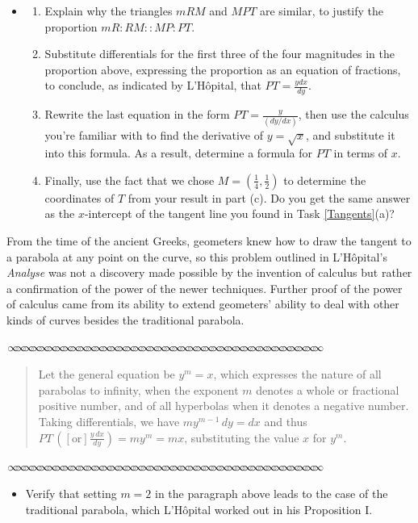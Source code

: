 \documentclass[11pt]{article}
\newcommand{\sep}{\vspace{-3pt}
\begin{center}
{\mathversion{normal}
$\infty \mspace{-5.5mu}\infty \mspace{-5.5mu}\infty \mspace{-5.5mu}\infty \mspace{-5.5mu}
\infty \mspace{-5.5mu}\infty \mspace{-5.5mu}\infty \mspace{-5.5mu}\infty \mspace{-5.5mu}
\infty \mspace{-5.5mu}\infty \mspace{-5.5mu}\infty \mspace{-5.5mu}\infty \mspace{-5.5mu}
\infty \mspace{-5.5mu}\infty \mspace{-5.5mu}\infty \mspace{-5.5mu}\infty \mspace{-5.5mu}
\infty \mspace{-5.5mu}\infty \mspace{-5.5mu}\infty \mspace{-5.5mu}\infty \mspace{-5.5mu}
\infty \mspace{-5.5mu}\infty \mspace{-5.5mu}\infty \mspace{-5.5mu}\infty \mspace{-5.5mu}
\infty \mspace{-5.5mu}\infty \mspace{-5.5mu}\infty \mspace{-5.5mu}\infty \mspace{-5.5mu}
\infty \mspace{-5.5mu}\infty \mspace{-5.5mu}\infty \mspace{-5.5mu}\infty \mspace{-5.5mu}
\infty \mspace{-5.5mu}\infty \mspace{-5.5mu}\infty \mspace{-5.5mu}\infty \mspace{-5.5mu}
\infty \mspace{-5.5mu}\infty \mspace{-5.5mu}\infty \mspace{-5.5mu}\infty \mspace{-5.5mu}$}
\end{center} \vspace*{-5pt}}
\newenvironment{source}%
 {\bigskip \sep \vspace*{-6pt} \begin{quote}
          \begin{sf}   }
   {   \end{sf}     \end{quote} \vspace*{-6pt} \sep \bigskip}%
\newcounter{tasknumb}
\newcommand{\tasknumb}[1]{\refstepcounter{tasknumb}\textmd{\textbf{$\fbox{$\fbox{Task \thetasknumb}$}$}}#1}
\newenvironment{task}[1][]%
 {\begin{itemize}
 \item[\tasknumb{#1}] }
{
    \end{itemize}    }%
\begin{document}
\smallskip
\begin{task}[\label{find_tangent}]
\begin{enumerate} \itemsep -5pt
\item[(a)] Explain why the triangles $mRM$ and $MPT$ are similar, to justify the proportion $mR : RM :: MP : PT$. \\
\item[(b)] Substitute differentials for the first three of the four magnitudes in the proportion above, expressing the proportion as an equation of fractions, to conclude, as indicated by L'H\^opital, that $PT=\frac{ydx}{dy}$. \\
\item[(c)] Rewrite the last equation in the form $PT=\frac{y}{(dy/dx)}$, then use the calculus you're familiar with to find the derivative of $y=\sqrt{x}$, and substitute it into this formula. As a result, determine a formula for $PT$ in terms of $x$. \\
\item[(d)] Finally, use the fact that we chose $M=(\frac14, \frac12)$ to determine the coordinates of $T$ from your result in part (c). Do you get the same answer as the $x$-intercept of the tangent line you found in Task \ref{Tangents}(a)?
\end{enumerate}

 \end{task}

\smallskip
From the time of the ancient Greeks, geometers knew how to draw the tangent to a parabola at any point on the curve, so this problem outlined in L'H\^opital's \emph{Analyse} was not a discovery made possible by the invention of calculus but rather a confirmation of the power of the newer techniques. Further proof of the power of calculus came from its ability to extend geometers' ability to deal with other kinds of curves besides the traditional parabola.

\smallskip
\begin{source}
Let the general equation be $y^m=x$, which expresses the nature of all parabolas to infinity, when the exponent $m$ denotes a whole or fractional positive number, and of all hyperbolas when it denotes a negative number. Taking differentials, we have $my^{m-1}\,dy=dx$ and thus $PT\,\left([\textrm{or}] \frac{y\,dx}{dy}\right)=my^m=mx$, substituting the value $x$ for $y^m$.
\end{source}

\bigskip
\begin{task}[\label{traditional_parabola}]
Verify that setting $m=2$ in the paragraph above leads to the case of the traditional parabola, which L'H\^opital worked out in his Proposition I.
 \end{task}
\end{document}

